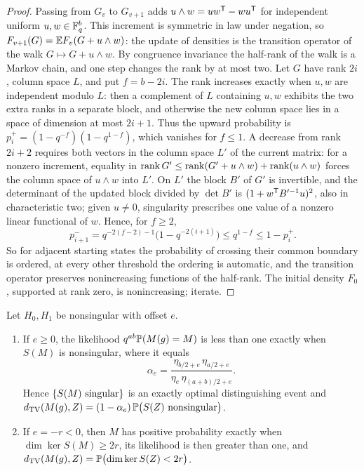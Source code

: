 \begin{proof}
Passing from $G_v$ to $G_{v+1}$ adds $u\wedge w=uw^{\mathsf{T}}-wu^{\mathsf{T}}$ for independent uniform
$u,w\in\mathbb{F}_q^b$. This increment is symmetric in law under negation, so
$F_{v+1}(G)=\mathbb{E} F_v(G+u\wedge w)$: the update of densities is the transition operator of the
walk $G\mapsto G+u\wedge w$. By congruence invariance the half-rank of the walk is a Markov chain,
and one step changes the rank by at most two. Let $G$ have rank $2i$, column space $L$, and put
$f=b-2i$. The rank increases exactly when $u,w$ are independent modulo $L$: then a complement of
$L$ containing $u,w$ exhibits the two extra ranks in a separate block, and otherwise the new
column space lies in a space of dimension at most $2i+1$. Thus the upward probability is
$p_i^+=(1-q^{-f})(1-q^{1-f})$, which vanishes for $f\le1$. A decrease from rank $2i+2$ requires
both vectors in the column space $L'$ of the current matrix: for a nonzero increment, equality
in $\operatorname{rank} G'\le\operatorname{rank}(G'+u\wedge w)+\operatorname{rank}(u\wedge w)$ forces the column space of $u\wedge w$
into $L'$. On $L'$ the block $B'$ of $G'$ is invertible, and the determinant of the updated block
divided by $\det B'$ is $(1+w^{\mathsf{T}}B'^{-1}u)^2$, also in characteristic two; given $u\ne0$,
singularity prescribes one value of a nonzero linear functional of $w$. Hence, for $f\ge2$,
\[
 p_{i+1}^-=q^{-2(f-2)-1}\bigl(1-q^{-2(i+1)}\bigr)\le q^{1-f}\le1-p_i^+ .
\]
So for adjacent starting states the probability of crossing their common boundary is ordered,
at every other threshold the ordering is automatic, and the transition operator preserves
nonincreasing functions of the half-rank. The initial density $F_0$, supported at rank zero,
is nonincreasing; iterate.
\end{proof}

\begin{theorem}\label{spn:thm:offset-test}
Let $H_0,H_1$ be nonsingular with offset $e$.
\begin{enumerate}
\item If $e\ge0$, the likelihood $q^{ab}\mathbb{P}(M(g)=M)$ is less than one exactly when $S(M)$ is
nonsingular, where it equals
\[
 \alpha_e=\frac{\eta_{b/2+e}\,\eta_{a/2+e}}{\eta_e\,\eta_{(a+b)/2+e}} .
\]
Hence $\{S(M)\text{ singular}\}$ is an exactly optimal distinguishing event and
$d_{\mathrm{TV}}(M(g),Z)=(1-\alpha_e)\,\mathbb{P}\bigl(S(Z)\text{ nonsingular}\bigr)$.
\item If $e=-r<0$, then $M$ has positive probability exactly when $\dim\ker S(M)\ge2r$, its
likelihood is then greater than one, and
$d_{\mathrm{TV}}(M(g),Z)=\mathbb{P}\bigl(\dim\ker S(Z)<2r\bigr)$.
\end{enumerate}
\end{theorem}

